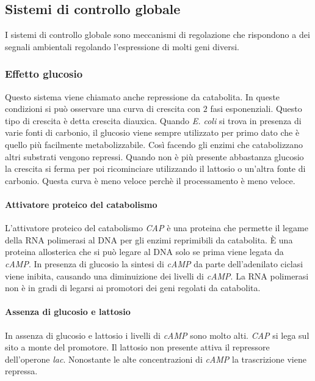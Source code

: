 	\subsection{Sistemi di controllo globale}
	I sistemi di controllo globale sono meccanismi di regolazione che rispondono a dei segnali ambientali regolando l'espressione di molti geni diversi. 

		\subsubsection{Effetto glucosio}
		Questo sistema viene chiamato anche repressione da catabolita.
		In queste condizioni si può osservare una curva di crescita con $2$ fasi esponenziali. 
		Questo tipo di crescita è detta crescita diauxica. 
		Quando \textit{E. coli} si trova in presenza di varie fonti di carbonio, il glucosio viene sempre utilizzato per primo dato che è quello pi\`u facilmente metabolizzabile. 
		Così facendo gli enzimi che catabolizzano altri substrati vengono repressi. 
		Quando non è più presente abbastanza glucosio la crescita si ferma per poi ricominciare utilizzando il lattosio o un'altra fonte di carbonio. 
		Questa curva è meno veloce perchè il processamento è meno veloce. 
		
			\paragraph{Attivatore proteico del catabolismo}
			L'attivatore proteico del catabolismo \emph{CAP} \`e una proteina che permette il legame della RNA polimerasi al DNA per gli enzimi reprimibili da catabolita.
			\`E una proteina allosterica che si pu\`o legare al DNA solo se prima viene legata da \emph{cAMP}.
			In presenza di glucosio la sintesi di \emph{cAMP} da parte dell'adenilato ciclasi viene inibita, causando una diminuizione dei livelli di \emph{cAMP}.
			La RNA polimerasi non \`e in gradi di legarsi ai promotori dei geni regolati da catabolita.

			\paragraph{Assenza di glucosio e lattosio}
			In assenza di glucosio e lattosio i livelli di \emph{cAMP} sono molto alti.
			\emph{CAP} si lega sul sito a monte del promotore.
			Il lattosio non presente attiva il repressore dell'operone \emph{lac}.
			Nonostante le alte concentrazioni di \emph{cAMP} la trascrizione viene repressa.

